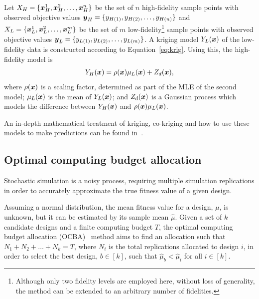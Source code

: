 \documentclass[journal]{IEEEtran}
\begin{document}
Let $X_H = \{\boldsymbol{x}_H^1,\boldsymbol{x}_H^2,\dots,\boldsymbol{x}_H^n\}$ be the set of $n$ high-fidelity sample points with observed objective values $\boldsymbol{y}_H = \{y_{H(1)},y_{H(2)},\dots,y_{H(n)}\}$ and $X_L = \{\boldsymbol{x}_L^1,\boldsymbol{x}_L^2,\dots,\boldsymbol{x}_L^m\}$ be the set of $m$ low-fidelity\footnote{Although only two fidelity levels are employed here, without loss of generality, the method can be extended to an arbitrary number of fidelities.} sample points with observed objective values $\boldsymbol{y}_L = \{y_{L(1)},y_{L(2)},\dots,y_{L(m)}\}$. A kriging model $Y_L(\boldsymbol{x})$ of the low-fidelity data is constructed according to Equation~\ref{eq:krig}. Using this, the high-fidelity model is
\begin{equation}
Y_H(\boldsymbol{x}) = \rho(\boldsymbol{x})\mu_L(\boldsymbol{x}) + Z_d(\boldsymbol{x}),
\end{equation} 
where $\rho(\boldsymbol{x})$ is a scaling factor, determined as part of the MLE of the second model; $\mu_L(\boldsymbol{x})$ is the mean of $Y_L(\boldsymbol{x})$; and $Z_d(\boldsymbol{x})$ is a Gaussian process which models the difference between $Y_H(\boldsymbol{x})$ and $\rho(\boldsymbol{x})\mu_L(\boldsymbol{x})$.

An in-depth mathematical treatment of kriging, co-kriging and how to use these models to make predictions can be found in~\cite{forrester2008engineering,forrester2007multi,kennedy2001bayesian,kennedy2000predicting}.

\subsection{Optimal computing budget allocation}

Stochastic simulation is a noisy process, requiring multiple simulation replications in order to accurately approximate the true fitness value of a given design. 

Assuming a normal distribution, the mean fitness value for a design, $\mu$, is unknown, but it can be estimated by its sample mean $\hat{\mu}$. 
Given a set of $k$ candidate designs and a finite computing budget $T$, the optimal computing budget allocation (OCBA)~\cite{chen2011stochastic} method aims to find an allocation such that ${N_1 + N_2 + \dots + N_k = T}$, where $N_i$ is the total replications allocated to design $i$, in order to select the best design, $b \in [k]$, such that $\hat{\mu}_b < \hat{\mu}_i$ for all $i \in [k]$.
\end{document}
